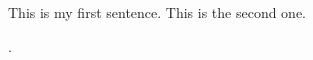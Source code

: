 \documentclass[a4paper]{article}
\begin{document}
This is my first sentence.
This is the second one.

\cite{belleflamme2015}.


\end{document}
